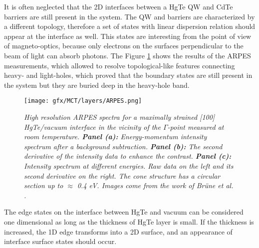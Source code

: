 \documentclass[titlepage,a4paper]{book}
\begin{document}
It is often neglected that the 2D interfaces between a HgTe QW and CdTe barriers are still present in the system. The QW and barriers are characterized by a different topology, therefore a set of states with linear dispersion relation should appear at the interface as well. This states are interesting from the point of view of magneto-optics, because only electrons on the surfaces perpendicular to the beam of light can absorb photons. The Figure \ref{fig:Layers_ARPES} shows the results of the ARPES measurements, which allowed to resolve topological-like features connecting heavy- and light-holes, which proved that the boundary states are still present in the system but they are buried deep in the heavy-hole band. 

\begin{figure}[ht]
	\centering
	\texttt{[image: gfx/MCT/layers/ARPES.png]}
	\vspace{-10pt}
	\caption{\textit{High resolution ARPES spectra for a maximally strained [100] HgTe/vacuum interface in the vicinity of the $\Gamma$-point measured at room temperature. \textbf{Panel (a):} Energy-momentum intensity spectrum after a background subtraction. \textbf{Panel (b):} The second derivative of the intensity data to enhance the contrast. \textbf{Panel (c):} Intensity spectrum at different energies. Raw data on the left and its second derivative on the right. The cone structure has a circular section up to $\approx$ 0.4 eV. Images come from the work of Brüne \textit{et al.} \cite{Brune_State2}.}}
	\label{fig:Layers_ARPES}
\end{figure} 

The edge states on the interface between HgTe and vacuum can be considered one dimensional as long as the thickness of HgTe layer is small. If the thickness is increased, the 1D edge transforms into a 2D surface, and an appearance of interface surface states should occur.
\end{document}
